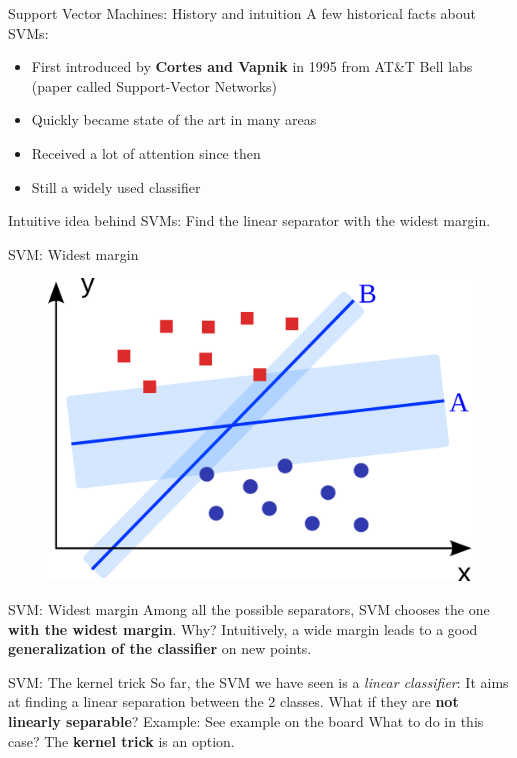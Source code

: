 \documentclass{beamer}
\begin{document}
\begin{frame}{Support Vector Machines: History and intuition}
A few historical facts about SVMs:
\begin{itemize}
	\item First introduced by \textbf{Cortes and Vapnik} in 1995 from AT\&T Bell labs (paper called Support-Vector Networks)
	\item Quickly became state of the art in many areas
	\item Received a lot of attention since then
	\item Still a widely used classifier
\end{itemize}
\vfill 
Intuitive idea behind SVMs: Find the linear separator with the widest margin.
\end{frame}
%
\begin{frame}{SVM: Widest margin}
\begin{figure}
\centering
\includegraphics[width=\textwidth]{images/svm_margin.png}
\end{figure}
\end{frame}
%
\begin{frame}{SVM: Widest margin}
Among all the possible separators, SVM chooses the one \textbf{with the widest margin}.
\vfill
\pause
Why? Intuitively, a wide margin leads to a good \textbf{generalization of the classifier} on new points.
\end{frame}
%
\begin{frame}{SVM: The kernel trick}
\vfill
So far, the SVM we have seen is a \textit{linear classifier}: It aims at finding a linear separation between the 2 classes. What if they are \textbf{not linearly separable}? 
\vfill
Example: See example on the board
\vfill
What to do in this case? \pause The \textbf{kernel trick} is an option.
\vfill
\end{frame}
\end{document}
